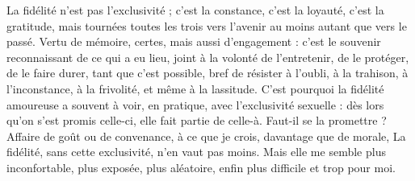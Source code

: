 La fidélité n’est pas l’exclusivité ; c’est la constance, c’est la loyauté, c’est la
gratitude, mais tournées toutes les trois vers l’avenir au moins autant que vers
le passé. Vertu de mémoire, certes, mais aussi d’engagement : c’est le souvenir
reconnaissant de ce qui a eu lieu, joint à la volonté de l’entretenir, de le protéger,
de le faire durer, tant que c’est possible, bref de résister à l'oubli, à la trahison,
à l’inconstance, à la frivolité, et même à la lassitude. C’est pourquoi la
fidélité amoureuse a souvent à voir, en pratique, avec l'exclusivité sexuelle : dès
lors qu'on s’est promis celle-ci, elle fait partie de celle-à. Faut-il se la
promettre ? Affaire de goût ou de convenance, à ce que je crois, davantage que
de morale, La fidélité, sans cette exclusivité, n’en vaut pas moins. Mais elle me
semble plus inconfortable, plus exposée, plus aléatoire, enfin plus difficile et
trop pour moi.

